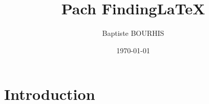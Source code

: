 \documentclass{article}
\begin{document}
\title{Pach Finding\LaTeX}
\author{Baptiste BOURHIS}
\date{\today}

\maketitle

\section{Introduction}
\end{document}
